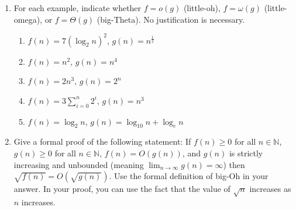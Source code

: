 \documentclass{article}
\begin{document}
\begin{enumerate}
    \item For each example, indicate whether $f = o(g)$ (little-oh), $f = \omega(g)$ (little-omega), or $f = \Theta(g)$ (big-Theta). No justification is necessary.
    \begin{enumerate}
        \item $f(n) = 7(\log_2 n)^2$, $g(n) = n^{\frac{1}{2}}$
        \item $f(n) = n^2$, $g(n) = n^4$
        \item $f(n) = 2n^3$, $g(n) = 2^n$
        \item $f(n) = 3 \sum_{i=0}^n 2^i$, $g(n) = n^3$
        \item $f(n) = \log_2 n$, $g(n) = \log_{10} n + \log_e n$
    \end{enumerate}
    \item Give a formal proof of the following statement: If $f(n) \ge 0$ for all $n \in \mathbb{N}$, $g(n) \ge 0$ for all $n \in \mathbb{N}$, $f(n) = O(g(n))$, and $g(n)$ is strictly increasing and unbounded (meaning $\lim_{n \to \infty} g(n) = \infty$) then $\sqrt{f(n)} = O(\sqrt{g(n)})$.
    Use the formal definition of big-Oh in your answer. In your proof, you can use the fact that the value of $\sqrt{n}$ increases as $n$ increases.


\end{enumerate}
\end{document}
